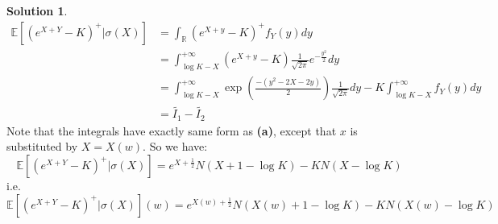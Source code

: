 \documentclass[a4paper, 10pt]{article}
\theoremstyle{definition}
\theoremstyle{hSol}
\newtheorem*{solution}{Solution}
\begin{document}
\begin{solution}
\begin{equation}
\begin{split}
		\mathbb{E}\left[(e^{X+Y}-K)^+| \sigma(X)\right] &= \int_{\mathbb{R}} (e^{X+y}-K)^+ f_Y(y)dy \\
		&= \int_{\log K - X}^{+\infty} (e^{X+y}-K) \frac{1}{\sqrt{2\pi}} e^{-\frac{y^2}{2}} dy \\
		&= \int_{\log K - X}^{+\infty} \exp\left(\frac{-(y^2-2X-2y)}{2}\right)\frac{1}{\sqrt{2\pi}} dy - K\int_{\log K - X}^{+\infty} f_Y(y) dy\\
		&= \tilde{I_1} - \tilde{I_2}
	\end{split}
\end{equation}
Note that the integrals have exactly same form as \textbf{(a)}, except that $x$ is substituted by $X=X(w)$. So we have:
\begin{equation}
	\mathbb{E}\left[(e^{X+Y}-K)^+| \sigma(X)\right] = e^{X+\frac{1}{2}}N(X+1-\log K) - K N(X-\log K) 
\end{equation}
i.e. 
\begin{equation}
	\mathbb{E}\left[(e^{X+Y}-K)^+| \sigma(X)\right] (w) = e^{X(w)+\frac{1}{2}}N(X(w)+1-\log K) - K N(X(w)-\log K) 
\end{equation}
\end{solution}
\end{document}
